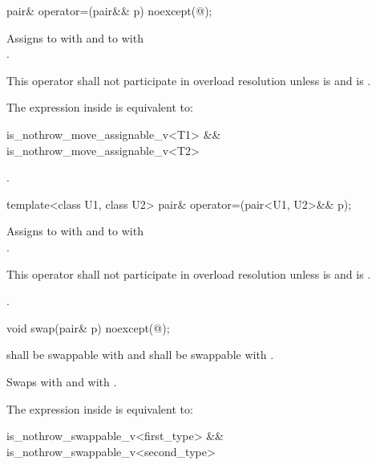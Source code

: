 %
\begin{itemdecl}
pair& operator=(pair&& p) noexcept(@\seebelow@);
\end{itemdecl}

\begin{itemdescr}
\pnum
\effects
Assigns to  with 
and to  with\\ .

\pnum
\remarks This operator shall not participate in overload resolution unless
 is 
and  is .

\pnum
\remarks The expression inside  is equivalent to:
\begin{codeblock}
is_nothrow_move_assignable_v<T1> && is_nothrow_move_assignable_v<T2>
\end{codeblock}

\pnum
\returns {}.
\end{itemdescr}

%
\begin{itemdecl}
template<class U1, class U2> pair& operator=(pair<U1, U2>&& p);
\end{itemdecl}

\begin{itemdescr}
\pnum
\effects
Assigns to  with 
and to  with\\ .

\pnum
\remarks This operator shall not participate in overload resolution unless
 is 
and  is .

\pnum
\returns {}.
\end{itemdescr}

%
\begin{itemdecl}
void swap(pair& p) noexcept(@\seebelow@);
\end{itemdecl}

\begin{itemdescr}
\pnum
\requires
{} shall be swappable with
 and  shall be swappable with .

\pnum
\effects Swaps
 with  and
 with .

\pnum
\remarks The expression inside  is equivalent to:
\begin{codeblock}
is_nothrow_swappable_v<first_type> && is_nothrow_swappable_v<second_type>
\end{codeblock}
\end{itemdescr}

